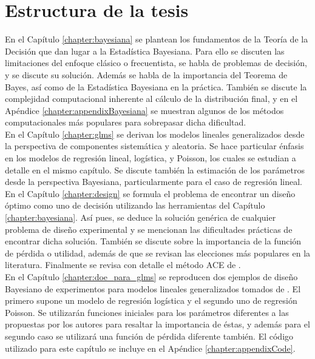 \section{Estructura de la tesis}


En el Capítulo \ref{chapter:bayesiana} se plantean los fundamentos de la Teoría de la Decisión que dan lugar a la Estadística Bayesiana. Para ello se discuten las limitaciones del enfoque clásico o frecuentista, se habla de problemas de decisión, y se discute su solución. Además se habla de la importancia del Teorema de Bayes, así como de la Estadística Bayesiana en la práctica. También se discute la complejidad computacional inherente al cálculo de la distribución final, y en el Apéndice \ref{chapter:appendixBayesiana} se muestran algunos de los métodos computacionales más populares para sobrepasar dicha dificultad. \\



En el Capítulo \ref{chapter:glms} se derivan los modelos lineales generalizados desde la perspectiva de componentes sistemática y aleatoria. Se hace particular énfasis en los modelos de regresión lineal, logística, y Poisson, los cuales se estudian a detalle 
en el mismo capítulo. Se discute también la estimación de los parámetros desde la perspectiva Bayesiana, particularmente para el caso de regresión lineal. \\




En el Capítulo \ref{chapter:design} se formula el problema de encontrar un diseño óptimo como uno de decisión utilizando las herramientas del Capítulo \ref{chapter:bayesiana}. Así pues, se deduce la solución genérica de cualquier problema de diseño experimental y se mencionan las dificultades prácticas de encontrar dicha solución. También se discute sobre la importancia de la función de pérdida o utilidad, además de que se revisan las elecciones más populares en la literatura. Finalmente se revisa con detalle el método ACE de \cite{Woods_ACE}.\\



En el Capítulo \ref{chapter:doe_para_glms} se reproducen dos ejemplos de diseño Bayesiano de experimentos para modelos lineales generalizados tomados de \cite{Woods_etal}. El primero supone un modelo de regresión logística y el segundo uno de regresión Poisson. Se utilizarán funciones iniciales para los parámetros diferentes a las propuestas por los autores para resaltar la importancia de éstas, y además para el segundo caso se utilizará una función de pérdida diferente también. El código utilizado para este capítulo se incluye en el Apéndice \ref{chapter:appendixCode}. \\




